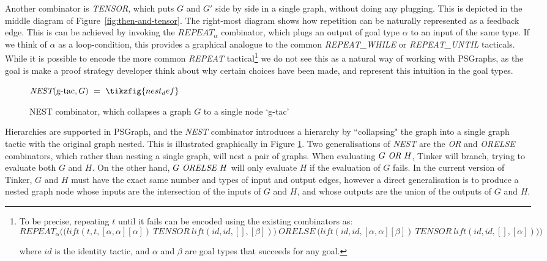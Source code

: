 \documentclass[submission,copyright,creativecommons]{eptcs}
\begin{document}
Another combinator is \textit{TENSOR}, which puts $G$ and $G'$ side by side in a single graph, without doing any plugging. This is depicted in the middle diagram of Figure~\ref{fig:then-and-tensor}. The right-most diagram shows how repetition can be naturally represented as a feedback edge. This is can be achieved by invoking the $\textit{REPEAT}_\alpha$ combinator, which plugs an output of goal type $\alpha$ to an input of the same type. If we think of $\alpha$ as a loop-condition, this provides a graphical analogue to the common \emph{REPEAT\_WHILE} or \emph{REPEAT\_UNTIL} tacticals. While it is possible to encode the more common \emph{REPEAT} tactical\footnote{To be precise, repeating $t$ until it fails can be encoded using the existing combinators as:
\vspace{-4pt}
$$
\textit{REPEAT}_\alpha\Big(
\big(\textit{lift}(t,t,[\alpha,\alpha][\alpha]) ~\textit{TENSOR}~
\textit{lift}(id,id,[],[\beta])\big)~\textit{ORELSE}~
\big(\textit{lift}(id,id,[\alpha,\alpha][\beta]) ~\textit{TENSOR}~
\textit{lift}(id,id,[],[\alpha])\big)\Big)
$$
\vspace{-12pt}

\noindent where $id$ is the identity tactic, and $\alpha$ and $\beta$ are goal types that succeeds for any goal.} we do not see this as a natural way of working with PSGraphs, as the goal is make a proof strategy developer think about why certain choices have been made, and represent this intuition in the goal types.

\begin{figure}[h]
  \centering
  $\textit{NEST}(\textrm{g-tac}, G) \ =\  \tikzfig{nest_def}$
  \vspace{-7pt}
    \caption{\label{fig:nest} NEST combinator, which collapses a graph $G$ to a single node `g-tac'}
\end{figure}

Hierarchies are supported in PSGraph, and the \textit{NEST} combinator introduces a hierarchy by ``collapsing" the graph into a single graph tactic with the original graph nested. This is illustrated graphically in Figure  \ref{fig:nest}. Two generalisations of \textit{NEST} are the \emph{OR} and \emph{ORELSE} combinators, which rather than nesting a single graph, will nest a pair of graphs. When evaluating $G~\emph{OR}~H$, Tinker will branch, trying to evaluate both $G$ and $H$. On the other hand, $G~\emph{ORELSE}~H$ will only evaluate $H$ if the evaluation of $G$ fails. In the current version of Tinker, $G$ and $H$ must have the exact same number and types of input and output edges, however a direct generalisation is to produce a nested graph node whose inputs are the intersection of the inputs of $G$ and $H$, and whose outputs are the union of the outputs of $G$ and $H$. 
\end{document}
